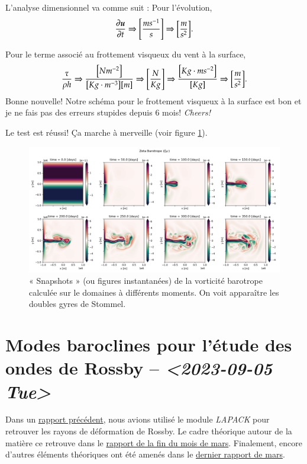 \documentclass[10pt]{article}
\numberwithin{equation}{section}
\newcommand{\uu}{\vb*{u}}
\begin{document}
L'analyse dimensionnel va comme suit : Pour l'évolution,
\begin{equation}
   \pdv{\uu}{t} \Rightarrow \qty[ \frac{ms^{-1}}{s}] \Rightarrow \qty[\frac{m}{s^2}]. 
\end{equation}

Pour le terme associé au frottement visqueux du vent à la surface,
\begin{equation}
   \frac{\tau}{\rho h} \Rightarrow \frac{\qty[N m^{-2}]}{\qty[Kg\cdot m^{-3}] \qty[m]} \Rightarrow \qty[\frac{N}{Kg}] \Rightarrow \frac{\qty[Kg \cdot m s^{-2}]}{[Kg]} \Rightarrow \qty[\frac{m}{s^2}].
\end{equation}
Bonne nouvelle! Notre schéma pour le frottement visqueux à la surface est bon et je ne fais pas des erreurs stupides depuis 6 mois! \emph{Cheers!} \bigskip

Le test est réussi! Ça marche à merveille (voir figure \ref{fig:orgcc464a6}).

\begin{figure}[htbp]
\centering
\includegraphics[width=.9\linewidth]{figures/tests/2023-09-06_8panneaux_zetaBT.png}
\caption{\label{fig:orgcc464a6}« Snapshots » (ou figures instantanées) de la vorticité barotrope calculée sur le domaines à différents moments. On voit apparaître les doubles gyres de Stommel.}
\end{figure}

\section{Modes baroclines pour l'étude des ondes de Rossby -- \textit{<2023-09-05 Tue>}}
\label{sec:org4972f63}

Dans un \href{rapport-2023-04-07.pdf}{rapport précédent}, nous avions utilisé le module \emph{LAPACK} pour retrouver les rayons de déformation de Rossby.
Le cadre théorique autour de la matière ce retrouve dans le \href{rapport-2023-03-24.pdf}{rapport de la fin du mois de mars}.
Finalement, encore d'autres éléments théoriques ont été amenés dans le \href{rapport-2023-03-31.pdf}{dernier rapport de mars}.\bigskip
\end{document}
